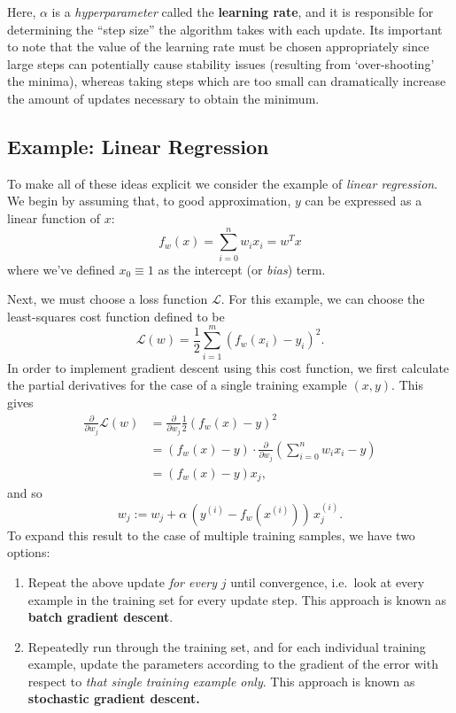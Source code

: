 \documentclass[../main.tex]{subfiles}
\begin{document}
Here, $\alpha$ is a \emph{hyperparameter} called the \textbf{learning rate},
and it is responsible for determining the ``step size'' the algorithm takes
with each update.
%
Its important to note that the value of the learning rate must be chosen
appropriately since large steps can potentially cause stability issues
(resulting from `over-shooting' the minima), whereas taking steps which are too
small can dramatically increase the amount of updates necessary to obtain the
minimum.
 
\subsection{Example: Linear Regression}%
\label{subsec:linear_regression} 
To make all of these ideas explicit we consider the example of \emph{linear
regression}.  We begin by assuming that, to good approximation, $y$ can be
expressed as a linear function of $x$:
%
\begin{equation} f_{w}(x) = \sum_{i=0}^{n} w_{i} x_{i} = w^{T} x \end{equation}
%
where we've defined $x_{0} \equiv 1$ as the intercept (or \emph{bias}) term.

Next, we must choose a loss function $\mathcal{L}$.
%
For this example, we can choose the least-squares cost function defined to be
%
\begin{equation}
  \mathcal{L}(w) = \frac{1}{2}\sum_{i = 1}^{m} {\left(f_{w} (x_{i}) - y_{i}
    \right)}^{2}.
\end{equation}
%
In order to implement gradient descent using this cost function, we first
calculate the partial derivatives for the case of a single training example
$(x, y)$.
%
This gives
\begin{align}
  \frac{\partial}{\partial w_j} \mathcal{L}(w) 
    &= \frac{\partial}{\partial w_j} \frac{1}{2} {\left(f_{w}(x) - y\right)}^2 \\
    &= (f_w(x) - y) \cdot \frac{\partial}{\partial w_j} {\left(\sum_{i=0}^{n}
      w_i x_i - y\right)} \\
    & =(f_w(x) - y) x_j,
\end{align}
%
and so
\begin{equation}
  w_j := w_j + \alpha\, {\left(y^{(i)} - f_w(x^{(i)})\right)}\, x^{(i)}_j.
\end{equation}
%
To expand this result to the case of multiple training samples, we have two
options:
\begin{enumerate}
  \item Repeat the above update \emph{for every} $j$ until convergence, i.e.\
    look at every example in the training set for every update step. This
    approach is known as \textbf{batch gradient descent}.
  \item Repeatedly run through the training set, and for each individual
    training example, update the parameters according to the gradient of the
    error with respect to \emph{that single training example only}. This
    approach is known as \textbf{stochastic gradient descent.}
\end{enumerate}
\end{document}
